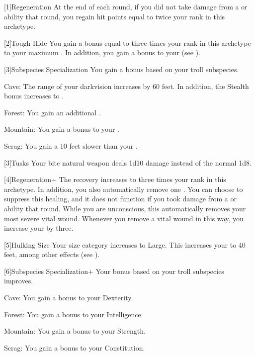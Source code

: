     [1]{Regeneration} At the end of each round, if you did not take damage from a \atAcid or \atFire ability that round, you regain hit points equal to twice your rank in this archetype.

    [2]{Tough Hide} You gain a bonus equal to three times your rank in this archetype to your maximum .
      In addition, you gain a  bonus to your  (see ).

    [3]{Subspecies Specialization} You gain a bonus based on your troll subspecies.
      \begin{raggeditemize}
        \item Cave: The range of your darkvision increases by 60 feet.
          In addition, the Stealth bonus increases to .
        \item Forest: You gain an additional .
        \item Mountain: You gain a  bonus to your .
        \item Scrag: You gain a  10 feet slower than your .
      \end{raggeditemize}

    [3]{Tusks} Your bite natural weapon deals 1d10 damage instead of the normal 1d8.

    [4]{Regeneration+} The recovery increases to three times your rank in this archetype.
      In addition, you also automatically remove one .
      You can choose to suppress this healing, and it does not function if you took damage from a \atAcid or \atFire ability that round.
      While you are unconscious, this automatically removes your most severe vital wound.
      Whenever you remove a vital wound in this way, you increase your  by three.

    [5]{Hulking Size} Your size category increases to Large.
    This increases your  to 40 feet, among other effects (see ).

    [6]{Subspecies Specialization+} Your bonus based on your troll subspecies improves.
      \begin{raggeditemize}
        \item Cave: You gain a  bonus to your Dexterity.
        \item Forest: You gain a  bonus to your Intelligence.
        \item Mountain: You gain a  bonus to your Strength.
        \item Scrag: You gain a  bonus to your Constitution.
      \end{raggeditemize}

